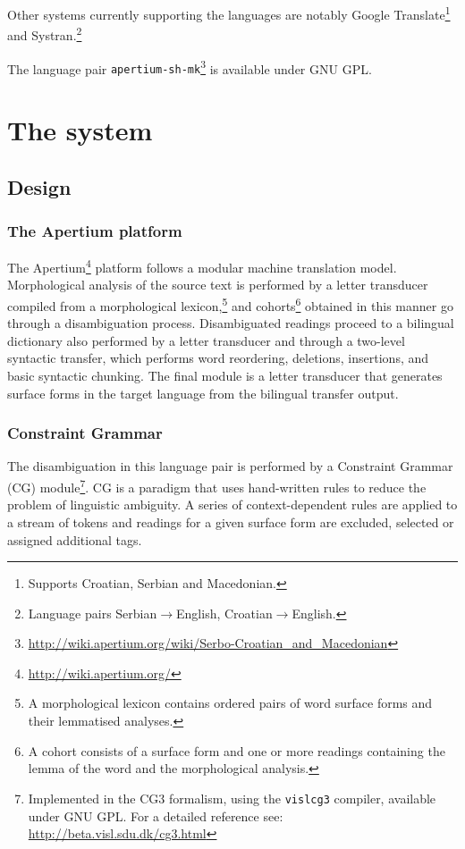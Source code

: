 \documentclass{book}
\begin{document}
Other systems currently supporting the languages are notably Google Translate\footnote{Supports Croatian, Serbian and Macedonian.} and Systran.\footnote{Language pairs Serbian$\rightarrow$English, Croatian$\rightarrow$English.}

The language pair {\small{\tt apertium-sh-mk}}\footnote{\url{http://wiki.apertium.org/wiki/Serbo-Croatian_and_Macedonian}} is available under GNU GPL.

\mainmatter

\chapter{The system}
\section{Design}
\subsection* {The Apertium platform}
\nocite{forcada2011apertium}
The Apertium\footnote{\url{http://wiki.apertium.org/}}  platform follows a modular machine translation model.
Morphological analysis of the source text is performed by a letter 
transducer compiled from a morphological lexicon,\footnote{A morphological lexicon 
contains ordered pairs of word surface forms and their lemmatised analyses.} 
and cohorts\footnote{A cohort 
consists of a surface form and one or more readings containing the lemma of the 
word and the morphological analysis.} obtained in this manner go through
a disambiguation process. 
Disambiguated readings proceed to a bilingual dictionary also performed 
by a letter transducer and  through a two-level syntactic transfer, 
which performs word reordering, deletions, insertions, and basic syntactic chunking.
The final module is a letter transducer that generates surface forms in the target language from 
the bilingual transfer output.

\subsection* {Constraint Grammar}
The 
disambiguation in this language pair is performed by a
Constraint Grammar (CG) module\footnote{Implemented in the CG3 formalism, using the \texttt{vislcg3} compiler, available under GNU GPL. For a detailed reference see: \url{http://beta.visl.sdu.dk/cg3.html}}. CG is a 
paradigm that uses hand-written rules to reduce the problem 
of linguistic ambiguity. A series of context-dependent rules are applied 
to a stream of tokens and readings for a given surface form are excluded, 
selected or assigned additional tags.
\end{document}
